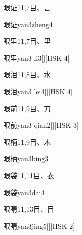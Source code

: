 \begin{entry}{眼证}{11,7}{⽬、⾔}
  \begin{phonetics}{眼证}{yan3zheng4}
  \end{phonetics}
\end{entry}

\begin{entry}{眼里}{11,7}{⽬、⾥}
  \begin{phonetics}{眼里}{yan3 li3}[][HSK 4]
  \end{phonetics}
\end{entry}

\begin{entry}{眼泪}{11,8}{⽬、⽔}
  \begin{phonetics}{眼泪}{yan3 lei4}[][HSK 4]
  \end{phonetics}
\end{entry}

\begin{entry}{眼前}{11,9}{⽬、⼑}
  \begin{phonetics}{眼前}{yan3 qian2}[][HSK 3]
  \end{phonetics}
\end{entry}

\begin{entry}{眼柄}{11,9}{⽬、⽊}
  \begin{phonetics}{眼柄}{yan3bing3}
  \end{phonetics}
\end{entry}

\begin{entry}{眼袋}{11,11}{⽬、⾐}
  \begin{phonetics}{眼袋}{yan3dai4}
  \end{phonetics}
\end{entry}

\begin{entry}{眼睛}{11,13}{⽬、⽬}
  \begin{phonetics}{眼睛}{yan3jing5}[][HSK 2]
  \end{phonetics}
\end{entry}

